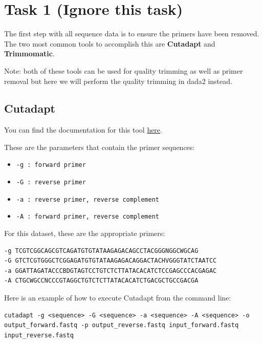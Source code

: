 \documentclass[
]{book}
\providecommand{\tightlist}{%
  \setlength{\itemsep}{0pt}\setlength{\parskip}{0pt}}
\begin{document}
\hypertarget{task-1-ignore-this-task}{%
\section{Task 1 (Ignore this task)}\label{task-1-ignore-this-task}}

The first step with all sequence data is to ensure the primers have been removed. The two most common tools to accomplish this are \textbf{Cutadapt} and \textbf{Trimmomatic}.

Note: both of these tools can be used for quality trimming as well as primer removal but here we will perform the quality trimming in dada2 instead.

\hypertarget{cutadapt-1}{%
\subsection{Cutadapt}\label{cutadapt-1}}

You can find the documentation for this tool \href{https://cutadapt.readthedocs.io/en/stable/}{here}.

These are the parameters that contain the primer sequences:

\begin{itemize}
\tightlist
\item
  \texttt{-g\ :\ forward\ primer}
\item
  \texttt{-G\ :\ reverse\ primer}
\item
  \texttt{-a\ :\ reverse\ primer,\ reverse\ complement}
\item
  \texttt{-A\ :\ forward\ primer,\ reverse\ complement}
\end{itemize}

For this dataset, these are the appropriate primers:

\begin{verbatim}
-g TCGTCGGCAGCGTCAGATGTGTATAAGAGACAGCCTACGGGNGGCWGCAG
-G GTCTCGTGGGCTCGGAGATGTGTATAAGAGACAGGACTACHVGGGTATCTAATCC
-a GGATTAGATACCCBDGTAGTCCTGTCTCTTATACACATCTCCGAGCCCACGAGAC
-A CTGCWGCCNCCCGTAGGCTGTCTCTTATACACATCTGACGCTGCCGACGA
\end{verbatim}

Here is an example of how to execute Cutadapt from the command line:

\begin{verbatim}
cutadapt -g <sequence> -G <sequence> -a <sequence> -A <sequence> -o output_forward.fastq -p output_reverse.fastq input_forward.fastq input_reverse.fastq
\end{verbatim}
\end{document}
